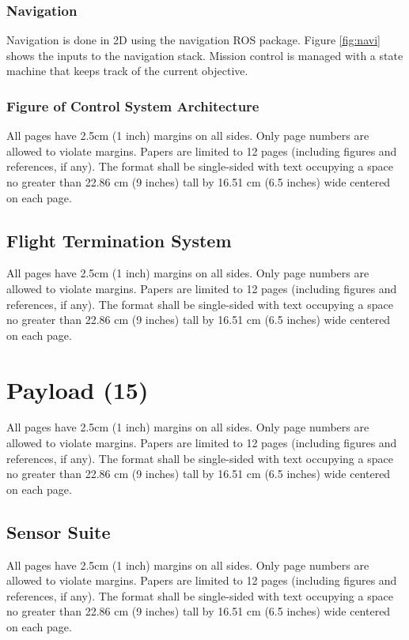 \documentclass[12pt, letterpaper]{article}
\begin{document}
\subsubsection{Navigation}
Navigation is done in 2D using the navigation ROS package. Figure \eqref{fig:navi} shows the inputs to the navigation stack. Mission control is managed with a state machine that keeps track of the current objective.  


\subsubsection{Figure of Control System Architecture}
All pages have 2.5cm (1 inch) margins on all sides. Only page numbers are allowed to violate margins. Papers are limited to 12 pages (including figures and references, if any). The format shall be single-sided with text occupying a space no greater than 22.86 cm (9 inches) tall by 16.51 cm (6.5 inches) wide centered on each page.

\subsection{Flight Termination System}
All pages have 2.5cm (1 inch) margins on all sides. Only page numbers are allowed to violate margins. Papers are limited to 12 pages (including figures and references, if any). The format shall be single-sided with text occupying a space no greater than 22.86 cm (9 inches) tall by 16.51 cm (6.5 inches) wide centered on each page.


\section{Payload (15)}
All pages have 2.5cm (1 inch) margins on all sides. Only page numbers are allowed to violate margins. Papers are limited to 12 pages (including figures and references, if any). The format shall be single-sided with text occupying a space no greater than 22.86 cm (9 inches) tall by 16.51 cm (6.5 inches) wide centered on each page.

\subsection{Sensor Suite}
All pages have 2.5cm (1 inch) margins on all sides. Only page numbers are allowed to violate margins. Papers are limited to 12 pages (including figures and references, if any). The format shall be single-sided with text occupying a space no greater than 22.86 cm (9 inches) tall by 16.51 cm (6.5 inches) wide centered on each page.
\end{document}
